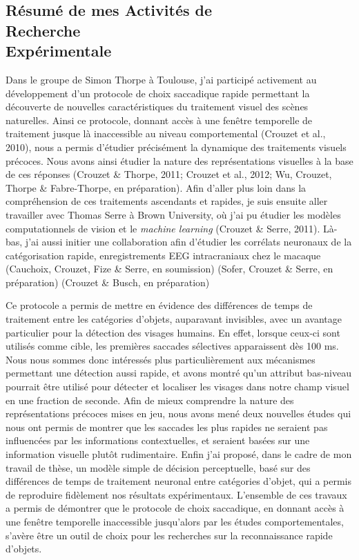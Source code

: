 \documentclass[margin,line]{resume}
\begin{document}
\begin{resume}
\section{\mysidestyle Résumé de mes Activités de\\Recherche\\Expérimentale}
Dans le groupe de Simon Thorpe à Toulouse, j'ai participé activement au développement d'un protocole de choix saccadique rapide permettant la découverte de nouvelles caractéristiques du traitement visuel des scènes naturelles. Ainsi ce protocole, donnant accès à une fenêtre temporelle de traitement jusque là inaccessible au niveau comportemental (Crouzet et al., 2010),
nous a permis d'étudier précisément la dynamique des traitements visuels précoces. Nous avons ainsi étudier la nature des  représentations visuelles à la base de ces réponses (Crouzet \& Thorpe, 2011; Crouzet et al., 2012; Wu, Crouzet, Thorpe \& Fabre-Thorpe, en préparation). Afin d'aller plus loin dans la compréhension de ces traitements ascendants et rapides, je suis ensuite aller travailler avec Thomas Serre à Brown University, où j'ai pu étudier les modèles computationnels de vision et le \emph{machine learning} (Crouzet \& Serre, 2011). Là-bas, j'ai aussi initier une collaboration afin d'étudier les corrélats neuronaux de la catégorisation rapide, 
enregistrements EEG intracraniaux chez le macaque (Cauchoix, Crouzet, Fize \& Serre, en soumission)
(Sofer, Crouzet \& Serre, en préparation)
(Crouzet \& Busch, en préparation)

 Ce protocole a permis de mettre en évidence des différences de temps de traitement entre les catégories d'objets, auparavant invisibles, avec un avantage particulier pour la détection des visages humains. En effet, lorsque ceux-ci sont utilisés comme cible, les premières saccades sélectives apparaissent dès 100 ms. Nous nous sommes donc intéressés plus particulièrement aux mécanismes permettant une détection aussi rapide, et avons montré qu'un attribut bas-niveau pourrait être utilisé pour détecter et localiser les visages dans notre champ visuel en une fraction de seconde.  Afin de mieux comprendre la nature des représentations précoces mises en jeu, nous avons mené deux nouvelles études qui nous ont permis de montrer que les saccades les plus rapides ne seraient pas influencées par les informations contextuelles, et seraient basées sur une information visuelle plutôt rudimentaire. Enfin j'ai proposé, dans le cadre de mon travail de thèse, un modèle simple de décision perceptuelle, basé sur des différences de temps de traitement neuronal entre catégories d’objet, qui a permis de reproduire fidèlement nos résultats expérimentaux. L'ensemble de ces travaux a permis de démontrer que le protocole de choix saccadique, en donnant accès à une fenêtre temporelle inaccessible jusqu'alors par les études comportementales, s’avère être un outil de choix pour les recherches sur la reconnaissance rapide d'objets.


\end{resume}
\end{document}
